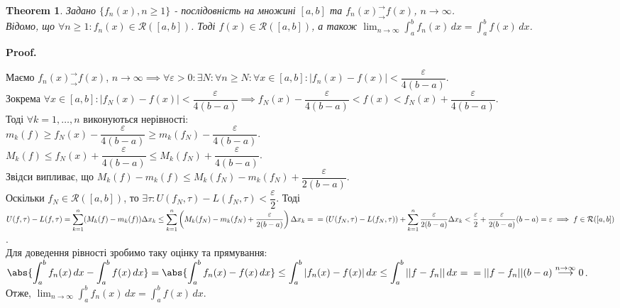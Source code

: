 \documentclass[a4paper, 10pt]{article}
\makeatletter
\def\huge{\displaystyle}
\def\qed{$\blacksquare$}
\theoremstyle{theoremdd}
\newtheorem{theorem}{Theorem}[subsection]
\theoremstyle{theoremdd}
\theoremstyle{theoremdd}
\theoremstyle{theoremdd}
\theoremstyle{theoremdd}
\theoremstyle{theoremdd}
\theoremstyle{theoremdd}
\theoremstyle{theoremdd}
\theoremstyle{theoremdd}
\renewenvironment{proof}[1][Proof.\\]{\par
\pushQED{\hfill \qed}%
\normalfont \topsep6\p@\@plus6\p@\relax
\trivlist
\item\relax
{\bfseries
#1\@addpunct{.}}\hspace\labelsep\ignorespaces
}{%
\popQED\endtrivlist\@endpefalse
}
\makeatother
\begin{document}
\begin{theorem}
Задано $\{f_n(x), n \geq 1\}$ - послідовність на множині $[a,b]$ та $f_n(x)^\rightarrow_\rightarrow f(x)$, $n \to \infty$.\\
Відомо, що $\forall n \geq 1: f_n(x) \in \mathcal{R}([a,b])$. Тоді $f(x) \in \mathcal{R}([a,b])$, а також $\huge\lim_{n \to \infty} \int_a^b f_n(x)\,dx = \int_a^b f(x)\,dx$.
\end{theorem}

\begin{proof}
Маємо $f_n(x)^\rightarrow_\rightarrow f(x)$, $n \to \infty \implies \forall \varepsilon > 0: \exists N: \forall n \geq N: \forall x \in [a,b]: |f_n(x)-f(x)| < \dfrac{\varepsilon}{4(b-a)}$.\\
Зокрема $\forall x \in [a,b]: |f_N(x) - f(x)| < \dfrac{\varepsilon}{4(b-a)} \implies f_N(x) - \dfrac{\varepsilon}{4(b-a)} < f(x) < f_N(x) + \dfrac{\varepsilon}{4(b-a)}$. \\
Тоді $\forall k = 1,\dots,n$ виконуються нерівності:\\
$m_k(f) \geq f_N(x) - \dfrac{\varepsilon}{4(b-a)} \geq m_k(f_N) - \dfrac{\varepsilon}{4(b-a)}$.\\
$M_k(f) \leq f_N(x) + \dfrac{\varepsilon}{4(b-a)} \leq M_k(f_N) + \dfrac{\varepsilon}{4(b-a)}$.\\
Звідси випливає, що $M_k(f) - m_k(f) \leq M_k(f_N) - m_k(f_N) + \dfrac{\varepsilon}{2(b-a)}$.\\
Оскільки $f_N \in \mathcal{R}([a,b])$, то $\exists \tau: U(f_N,\tau) - L(f_N,\tau) < \dfrac{\varepsilon}{2}$. Тоді\\
$U(f,\tau) - L(f,\tau) = \huge\sum_{k=1}^n (M_k(f)-m_k(f))\Delta x_k \leq \huge\sum_{k=1}^n \left( M_k(f_N) - m_k(f_N) + \dfrac{\varepsilon}{2(b-a)} \right) \Delta x_k = \\ = (U(f_N,\tau) - L(f_N,\tau)) + \huge\sum_{k=1}^n \dfrac{\varepsilon}{2(b-a)}\Delta x_k < \dfrac{\varepsilon}{2} + \dfrac{\varepsilon}{2(b-a)} (b-a) = \varepsilon \implies f \in \mathcal{R}([a,b])$.\\
Для доведення рівності зробимо таку оцінку та прямування:\\
$\huge\abs{\int_a^b f_n(x)\,dx - \int_a^b f(x)\,dx} = \abs{\int_a^b f_n(x)-f(x)\,dx} \leq \int_a^b |f_n(x)-f(x)|\,dx \leq \int_a^b ||f-f_n||\,dx = \\ = ||f-f_n|| (b-a) \overset{n \to \infty}{\longrightarrow} 0$.\\
Отже, $\huge\lim_{n \to \infty} \int_a^b f_n(x)\,dx = \int_a^b f(x)\,dx$.
\end{proof}
\end{document}
